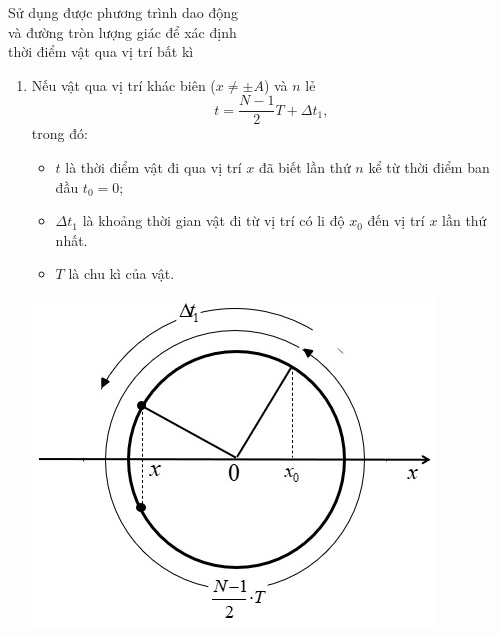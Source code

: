 \begin{dang}{Sử dụng được phương trình dao động\\ và đường tròn lượng giác để xác định\\ thời điểm vật qua vị trí bất kì}
{\begin{description}
\begin{enumerate}[label=\alph*)]
				\item Nếu vật qua vị trí khác biên ($x\neq\pm A$) và $n$ lẻ
				\begin{equation*}
					t=\dfrac{N-1}{2}T+\Delta t_1,
				\end{equation*}
				trong đó:
				\begin{itemize}
					\item $t$ là thời điểm vật đi qua vị trí $x$ đã biết lần thứ $n$ kể từ thời điểm ban đầu $t_0=0$;
					\item $\Delta t_1$ là khoảng thời gian vật đi từ vị trí có li độ $x_0$ đến vị trí $x$ lần thứ nhất.
					\item $T$ là chu kì của vật.
				\end{itemize}
				\begin{center}
					\includegraphics[scale=0.8]{../figs/VN12-PH-02-A-001-4-V2-4.jpg}
				\end{center}
				

\end{enumerate}
\end{description}}
\end{dang}
